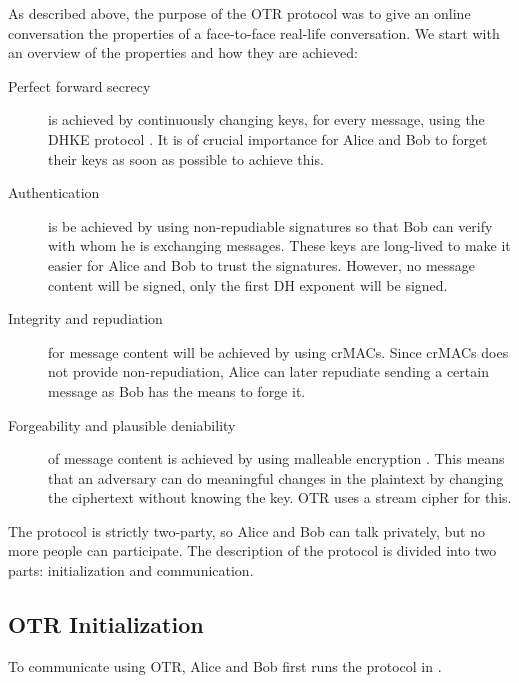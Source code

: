 As described above, the purpose of the \ac{OTR} protocol was to give an online 
conversation the properties of a face-to-face real-life conversation.
We start with an overview of the properties and how they are achieved:
\begin{description}
  \item[Perfect forward secrecy] is achieved by continuously changing keys, for 
    every message, using the \ac{DHKE} protocol \cite{dh}.
    It is of crucial importance for Alice and Bob to forget their keys as soon 
    as possible to achieve this.

  \item[Authentication] is be achieved by using non-repudiable signatures so 
    that Bob can verify with whom he is exchanging messages.
    These keys are long-lived to make it easier for Alice and Bob to trust the 
    signatures.
    However, no message content will be signed, only the first \ac{DH} exponent 
    will be signed.

  \item[Integrity and repudiation] for message content will be achieved by 
    using \acp{crMAC}.
    Since \acp{crMAC} does not provide non-repudiation, Alice can later 
    repudiate sending a certain message as Bob has the means to forge it.

  \item[Forgeability and plausible deniability] of message content is achieved 
    by using malleable encryption \cite{nonmalleable}.
    This means that an adversary can do meaningful changes in the plaintext by 
    changing the ciphertext without knowing the key.
    \ac{OTR} uses a stream cipher for this.
\end{description}

The protocol is strictly two-party, so Alice and Bob can talk privately, but no 
more people can participate.
The description of the protocol is divided into two parts: initialization and 
communication.

\subsection{\acs{OTR} Initialization}

To communicate using \ac{OTR}, Alice and Bob first runs the protocol in 
.

